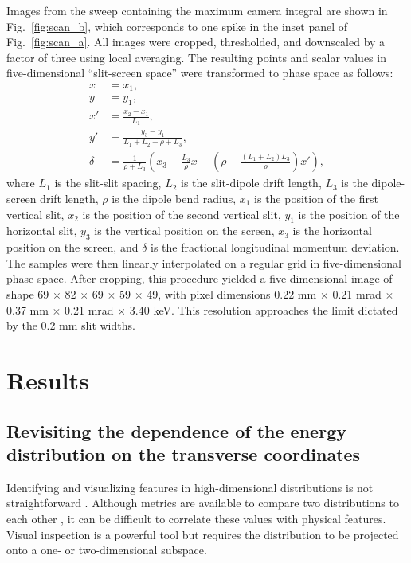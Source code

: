 \documentclass[%
 reprint,
 amsmath,amssymb,
 aps,
prstab,
]{revtex4-2}
\begin{document}
Images from the sweep containing the maximum camera integral are shown in Fig.~\ref{fig:scan_b}, which corresponds to one spike in the inset panel of Fig.~\ref{fig:scan_a}. All images were cropped, thresholded, and downscaled by a factor of three using local averaging. The resulting points and scalar values in five-dimensional ``slit-screen space'' were transformed to phase space as follows:
%
\begin{equation}
    \begin{aligned}
    x &= x_1, \\
    y &= y_1, \\
    x' &= \frac{x_2 - x_1}{L_1}, \\
    y' &= \frac{y_3 - y_1}{L_1 + L_2 + \rho + L_3}, \\
    \delta &= \frac{1}{\rho + L_3} 
    \left(
        x_3 + \frac{L_3}{\rho} x -
        \left({
            \rho - \frac{(L_1 + L_2) L_3}{\rho}
        }\right) x'
    \right),
    \end{aligned}
\end{equation}
%
where $L_1$ is the slit-slit spacing, $L_2$ is the slit-dipole drift length, $L_3$ is the dipole-screen drift length, $\rho$ is the dipole bend radius, $x_1$ is the position of the first vertical slit, $x_2$ is the position of the second vertical slit, $y_1$ is the position of the horizontal slit, $y_3$ is the vertical position on the screen, $x_3$ is the horizontal position on the screen, and $\delta$ is the fractional longitudinal momentum deviation. The samples were then linearly interpolated on a regular grid in five-dimensional phase space. After cropping, this procedure yielded a five-dimensional image of shape 69 $\times$ 82 $\times$ 69 $\times$ 59 $\times$ 49, with pixel dimensions 0.22 mm $\times$ 0.21 mrad $\times$ 0.37 mm $\times$ 0.21 mrad $\times$ 3.40 keV. This resolution approaches the limit dictated by the 0.2 mm slit widths.



\section{Results}\label{sec:results}

\subsection{Revisiting the dependence of the energy distribution on the transverse coordinates}\label{sec:results-a}

Identifying and visualizing features in high-dimensional distributions is not straightforward \cite{Liu2017}. Although metrics are available to compare two distributions to each other \cite{Loudin2003, Modarres2020, Wong2022-symmetry, Wong2022-tomography}, it can be difficult to correlate these values with physical features. Visual inspection is a powerful tool but requires the distribution to be projected onto a one- or two-dimensional subspace.
\end{document}
